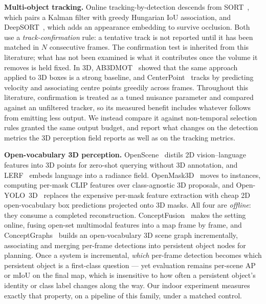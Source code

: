 \noindent\textbf{Multi-object tracking.} Online tracking-by-detection descends
from SORT~\cite{sort}, which pairs a Kalman filter with greedy Hungarian IoU
association, and DeepSORT~\cite{deepsort}, which adds an appearance embedding to
survive occlusion. Both use a \emph{track-confirmation} rule: a tentative
track is not reported until it has been matched in $N$ consecutive frames. The
confirmation test is inherited from this literature; what has not been examined
is what it contributes once the volume it removes is held fixed. In 3D,
AB3DMOT~\cite{ab3dmot} showed that the same approach applied to 3D boxes is a
strong baseline, and CenterPoint~\cite{centerpoint} tracks by predicting
velocity and associating centre points greedily across frames. Throughout this
literature, confirmation is treated as a tuned nuisance parameter and compared
against an unfiltered tracker, so its measured benefit includes whatever
follows from emitting less output. We instead compare it against non-temporal
selection rules granted the same output budget, and report what changes on the
detection metrics the 3D perception field reports as well as on the tracking
metrics.

\noindent\textbf{Open-vocabulary 3D perception.} OpenScene~\cite{openscene}
distils 2D vision--language features into 3D points for zero-shot querying
without 3D annotation, and LERF~\cite{lerf} embeds language into a radiance
field. OpenMask3D~\cite{openmask3d} moves to instances, computing per-mask CLIP
features over class-agnostic 3D proposals, and Open-YOLO~3D~\cite{openyolo3d}
replaces the expensive per-mask feature extraction with cheap 2D open-vocabulary
box predictions projected onto 3D masks. All four are \emph{offline}: they
consume a completed reconstruction. ConceptFusion~\cite{conceptfusion} makes the
setting online, fusing open-set multimodal features into a map frame by frame,
and ConceptGraphs~\cite{conceptgraphs} builds an open-vocabulary 3D scene graph
incrementally, associating and merging per-frame detections into persistent
object nodes for planning. Once a system is incremental, \emph{which} per-frame
detection becomes which persistent object is a first-class question --- yet
evaluation remains per-scene AP or mIoU on the final map, which is insensitive
to how often a persistent object's identity or class label changes along the
way. Our indoor experiment measures exactly that property, on a pipeline of
this family, under a matched control.

